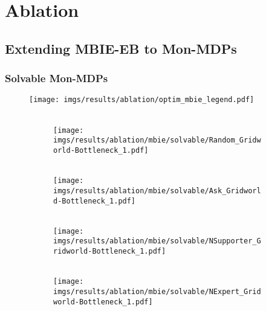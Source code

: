 \section{Ablation}
\label{appendix:ablation}
\subsection{Extending MBIE-EB to Mon-MDPs}
\subsubsection{Solvable Mon-MDPs}
%
%
%
\begin{figure}[bth]
    \centering
    \texttt{[image: imgs/results/ablation/optim\_mbie\_legend.pdf]}
    \\[3pt]
    \hfill
    \begin{subfigure}[b]{0.16\linewidth}
        \centering
        \\
        \texttt{[image: imgs/results/ablation/mbie/solvable/Random\_Gridworld-Bottleneck\_1.pdf]}
    \end{subfigure} 
    \hfill
        \begin{subfigure}[b]{0.16\linewidth}
        \centering
        \\
        \texttt{[image: imgs/results/ablation/mbie/solvable/Ask\_Gridworld-Bottleneck\_1.pdf]}
    \end{subfigure} 
    \hfill
        \begin{subfigure}[b]{0.16\textwidth}
        \centering
        \\
        \texttt{[image: imgs/results/ablation/mbie/solvable/NSupporter\_Gridworld-Bottleneck\_1.pdf]}
    \end{subfigure} 
    \hfill
    \begin{subfigure}[b]{0.16\textwidth}
        \centering
        \\
        \texttt{[image: imgs/results/ablation/mbie/solvable/NExpert\_Gridworld-Bottleneck\_1.pdf]}
    \end{subfigure} 

\end{figure}
